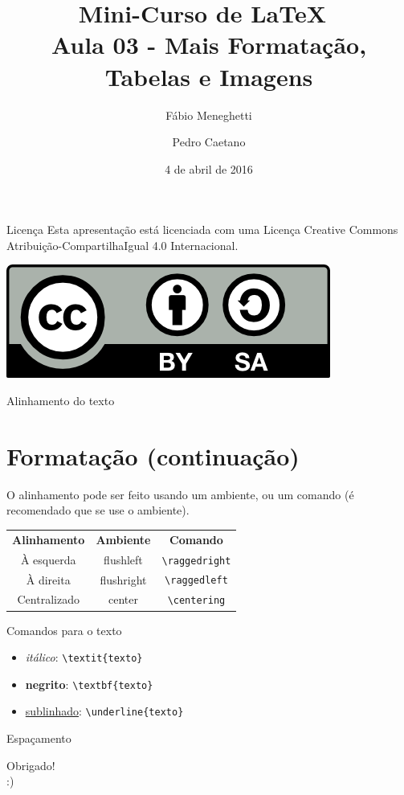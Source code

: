 \documentclass[12pt]{beamer}
\title{Mini-Curso de \LaTeX\ \\ Aula 03 - Mais Formatação, Tabelas e Imagens}
\author{Fábio Meneghetti \and Pedro Caetano}
\date{4 de abril de 2016}
\begin{document}
\begin{frame}
  \titlepage
\end{frame}

\begin{frame}{Licença}
  Esta apresentação está licenciada com uma Licença Creative Commons Atribuição-CompartilhaIgual 4.0 Internacional.
  \begin{center}
    \includegraphics[scale=0.3]{../license.png}
  \end{center}
\end{frame}

\begin{frame}
  \tableofcontents
\end{frame}

\begin{frame}[fragile]{Alinhamento do texto}
  \section{Formatação (continuação)}
  O alinhamento pode ser feito usando um ambiente, ou um comando (é recomendado que se use o ambiente).
  \begin{center}
    \begin{tabular}{ccc}
    \textbf{Alinhamento} & \textbf{Ambiente} & \textbf{Comando}\\
    À esquerda & flushleft & \verb+\raggedright+\\
    À direita & flushright & \verb+\raggedleft+\\
    Centralizado & center & \verb+\centering+\\
    \end{tabular}
  \end{center}
\end{frame}

\begin{frame}[fragile]{Comandos para o texto}
  \begin{itemize}
    \item \textit{itálico}: \verb+\textit{texto}+
    \item \textbf{negrito}: \verb+\textbf{texto}+
    \item \underline{sublinhado}: \verb+\underline{texto}+
  \end{itemize}
\end{frame}

\begin{frame}[fragile]{Espaçamento}


\end{frame}

\begin{frame}
  \begin{center}
    \large Obrigado!\\
    :)
  \end{center}
\end{frame}
\end{document}
